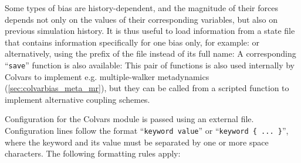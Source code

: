 {

Some types of bias are history-dependent, and the magnitude of their forces depends not only on the values of their corresponding variables, but also on previous simulation history.
It is thus useful to load information from a state file that contains information specifically for one bias only, for example:
\noindent{}or alternatively, using the prefix of the file instead of its full name:
A corresponding ``\texttt{save}'' function is also available:
\noindent{}This pair of functions is also used internally by Colvars to implement e.g.{} multiple-walker metadynamics (\ref{sec:colvarbias_meta_mr}), but they can be called from a scripted function to implement alternative coupling schemes.

\ifdefined{}\fi


}\fi %



Configuration for the Colvars module is passed using an external file\ifdefined{}\fi.
Configuration lines follow the format ``\texttt{keyword value}'' or ``\texttt{keyword \{ ... \}}'', where the keyword and its value must be separated by one or more space characters.
The following formatting rules apply:

